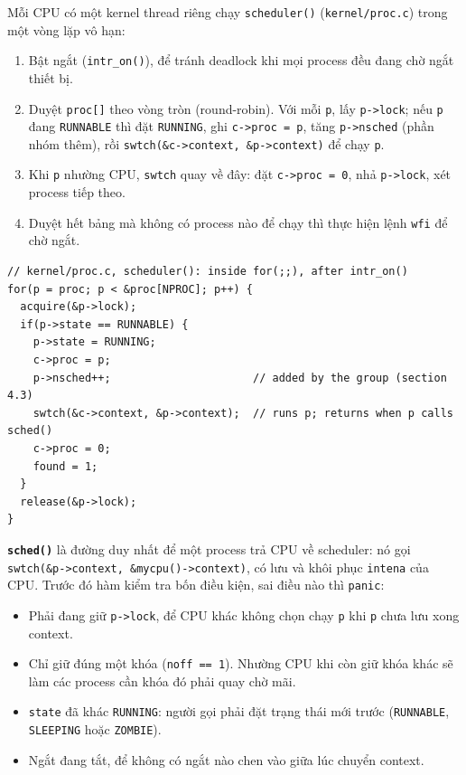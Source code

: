 Mỗi CPU có một kernel thread riêng chạy \texttt{scheduler()} (\texttt{kernel/proc.c}) trong một vòng lặp vô hạn:
\begin{enumerate}
    \item Bật ngắt (\texttt{intr\_on()}), để tránh deadlock khi mọi process đều đang chờ ngắt thiết bị.
    \item Duyệt \texttt{proc[]} theo vòng tròn (round-robin). Với mỗi \texttt{p}, lấy \texttt{p->lock}; nếu \texttt{p} đang \texttt{RUNNABLE} thì đặt \texttt{RUNNING}, ghi \texttt{c->proc = p}, tăng \texttt{p->nsched} (phần nhóm thêm), rồi \texttt{swtch(\&c->context, \&p->context)} để chạy \texttt{p}.
    \item Khi \texttt{p} nhường CPU, \texttt{swtch} quay về đây: đặt \texttt{c->proc = 0}, nhả \texttt{p->lock}, xét process tiếp theo.
    \item Duyệt hết bảng mà không có process nào để chạy thì thực hiện lệnh \texttt{wfi} để chờ ngắt.
\end{enumerate}

\begin{lstlisting}[style=xv6code]
// kernel/proc.c, scheduler(): inside for(;;), after intr_on()
for(p = proc; p < &proc[NPROC]; p++) {
  acquire(&p->lock);
  if(p->state == RUNNABLE) {
    p->state = RUNNING;
    c->proc = p;
    p->nsched++;                      // added by the group (section 4.3)
    swtch(&c->context, &p->context);  // runs p; returns when p calls sched()
    c->proc = 0;
    found = 1;
  }
  release(&p->lock);
}
\end{lstlisting}

\textbf{\texttt{sched()}} là đường duy nhất để một process trả CPU về scheduler: nó gọi \texttt{swtch(\&p->context, \&mycpu()->context)}, có lưu và khôi phục \texttt{intena} của CPU. Trước đó hàm kiểm tra bốn điều kiện, sai điều nào thì \texttt{panic}:
\begin{itemize}
    \item Phải đang giữ \texttt{p->lock}, để CPU khác không chọn chạy \texttt{p} khi \texttt{p} chưa lưu xong context.
    \item Chỉ giữ đúng một khóa (\texttt{noff == 1}). Nhường CPU khi còn giữ khóa khác sẽ làm các process cần khóa đó phải quay chờ mãi.
    \item \texttt{state} đã khác \texttt{RUNNING}: người gọi phải đặt trạng thái mới trước (\texttt{RUNNABLE}, \texttt{SLEEPING} hoặc \texttt{ZOMBIE}).
    \item Ngắt đang tắt, để không có ngắt nào chen vào giữa lúc chuyển context.
\end{itemize}

